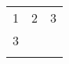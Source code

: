 \documentclass[a4paper, 12pt]{article}
\begin{document}
\begin{center}
\begin{tabular}{c c c }
1&2&3\\ 
3&&\\ 
&&\\ 
\end{tabular}
\end{center}
\end{document}
